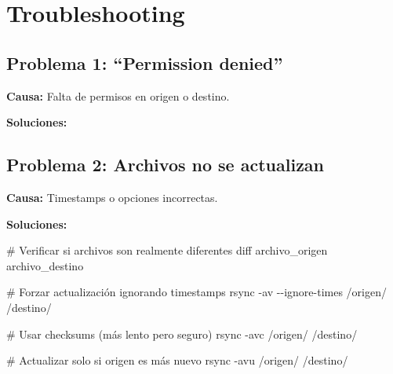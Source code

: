 \documentclass[
  doc,
  floatsintext,
  longtable,
  a4paper,
  nolmodern,
  notxfonts,
  notimes,
  12pt,
  colorlinks=true,linkcolor=blue,citecolor=blue,urlcolor=blue]{apa7}
\newenvironment{Shaded}{\begin{snugshade}}{\end{snugshade}}
\newcommand{\AttributeTok}[1]{\textcolor[rgb]{0.40,0.45,0.13}{#1}}
\newcommand{\CommentTok}[1]{\textcolor[rgb]{0.37,0.37,0.37}{#1}}
\newcommand{\FunctionTok}[1]{\textcolor[rgb]{0.28,0.35,0.67}{#1}}
\newcommand{\NormalTok}[1]{\textcolor[rgb]{0.00,0.23,0.31}{#1}}
\newcommand{\VariableTok}[1]{\textcolor[rgb]{0.07,0.07,0.07}{#1}}
\begin{document}
\section{Troubleshooting}\label{troubleshooting}

\subsection{Problema 1: ``Permission
denied''}\label{problema-1-permission-denied}

\textbf{Causa:} Falta de permisos en origen o destino.

\textbf{Soluciones:}

\begin{Shaded}
\end{Shaded}

\subsection{Problema 2: Archivos no se
actualizan}\label{problema-2-archivos-no-se-actualizan}

\textbf{Causa:} Timestamps o opciones incorrectas.

\textbf{Soluciones:}

\begin{Shaded}
\begin{Highlighting}[]
\CommentTok{\# Verificar si archivos son realmente diferentes}
\FunctionTok{diff}\NormalTok{ archivo\_origen archivo\_destino}

\CommentTok{\# Forzar actualización ignorando timestamps}
\FunctionTok{rsync} \AttributeTok{{-}av} \AttributeTok{{-}{-}ignore{-}times}\NormalTok{ /origen/ /destino/}

\CommentTok{\# Usar checksums (más lento pero seguro)}
\FunctionTok{rsync} \AttributeTok{{-}avc}\NormalTok{ /origen/ /destino/}

\CommentTok{\# Actualizar solo si origen es más nuevo}
\FunctionTok{rsync} \AttributeTok{{-}avu}\NormalTok{ /origen/ /destino/}
\end{Highlighting}
\end{Shaded}
\end{document}
